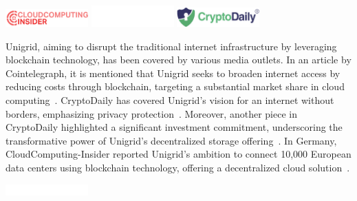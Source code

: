\documentclass[a4paper,oneside]{article}
\let\oldhref\href
\renewcommand{\href}[2]{\oldhref{#1}{\bfseries#2}}
\begin{document}
\begin{center}
\vspace{0.1cm}
\href{https://www.cloudcomputing-insider.de/unigrid-plant-europaweite-cloud-auf-blockchain-basis-a-8514f7f959be74ec0a64e77ea064a007/}{\includegraphics[width=90pt]{logo-cci}}
\hspace{1cm}
\href{https://cointelegraph.com/news/how-a-blockchain-network-plans-to-tackle-the-internets-major-shortcomings}{\includegraphics[width=90pt]{logo-ct}}
\hspace{1cm}
\href{https://cryptodaily.co.uk/2021/11/unigrid-next-internet-revolution}{\includegraphics[width=90pt]{logo-cryptodaily}}
\vspace{0.1cm}
\end{center}

\noindent Unigrid, aiming to disrupt the traditional internet infrastructure by leveraging blockchain technology, has been covered by various media outlets. In an article by Cointelegraph, it is mentioned that Unigrid seeks to broaden internet access by reducing costs through blockchain, targeting a substantial market share in cloud computing~\cite{cointelegraph}. CryptoDaily has covered Unigrid's vision for an internet without borders, emphasizing privacy protection~\cite{cryptodaily1}. Moreover, another piece in CryptoDaily highlighted a significant investment commitment, underscoring the transformative power of Unigrid's decentralized storage offering~\cite{cryptodaily2}. In Germany, CloudComputing-Insider reported Unigrid's ambition to connect 10,000 European data centers using blockchain technology, offering a decentralized cloud solution~\cite{germanpress}.

\begin{center}
\vspace{0.35cm}
\href{https://news.bitcoin.com/unigrid-secures-25m-investment-commitment-from-gem-digital-partners-wesendit-targets-cloud-giants/}{\includegraphics[width=90pt]{logo-bitcoin}}
\vspace{0.3cm}
\end{center}
\end{document}
